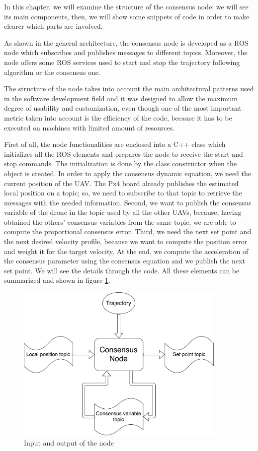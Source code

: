 In this chapter, we will examine the structure of the consensus node: we will see
its main components, then, we will show some snippets of code
in order to make clearer which parts are involved.

As shown in the general architecture, %
the consensus node is developed as a ROS node which subscribes and publishes messages
to different topics.
Moreover, the node offers some ROS services used to start and stop the trajectory
following algorithm or the consensus one.

The structure of the node takes into account the main architectural patterns used
in the software development field and it was designed to allow the maximum degree
of usability and customization, even though one of the most important metric taken
into account is the efficiency of the code, because it has to be executed on
machines with limited amount of resources.

First of all, the node functionalities are enclosed into a C++ class which initializes
all the ROS elements and prepares the node to receive the start and stop commands.
The initialization is done by the class constructor when the object is created.
In order to apply the consensus dynamic equation, we need
the current position of the UAV. The Px4 board already publishes the estimated
local position on a topic; %
so, we need to subscribe to that topic to retrieve the messages with the needed
information.
Second, we want to publish the consensus variable of the drone in the topic used
by all the other UAVs, because, having obtained the others' consensus variables
from the same topic, we are able to compute the proportional consensus error.
Third, we need the next set point and the next desired velocity profile,
because we want to compute the position error and weight it for the target velocity. %
At the end, we compute the acceleration of the consensus parameter using the consensus equation %
and we publish the next set point. We will see the details through the code.
All these elements can be summarized and shown in figure \ref{fig:node_in_out}.

\begin{figure}[h]
\centering
\includegraphics[width=0.9\textwidth]{chapters/chapter-03/figures/consensus_node_structure.pdf}
\caption{Input and output of the node}
\label{fig:node_in_out}
\end{figure}

